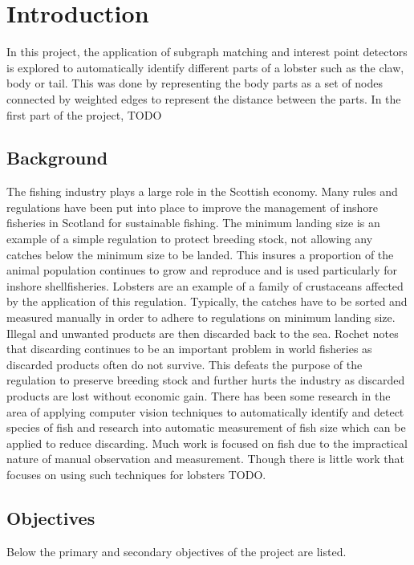 \section{Introduction}
In this project, the application of subgraph matching and interest point detectors is explored to automatically identify different parts of a lobster such as the claw, body or tail. This was done by representing the body parts as a set of nodes connected by weighted edges to represent the distance between the parts. 
\n
In the first part of the project, TODO


\subsection{Background}
The fishing industry plays a large role in the Scottish economy. Many rules and regulations have been put into place to improve the management of inshore fisheries in Scotland for sustainable fishing. The minimum landing size is an example of a simple regulation to protect breeding stock, not allowing any catches below the minimum size to be landed. This insures a proportion of the animal population continues to grow and reproduce \cite{masts-report} and is used particularly for inshore shellfisheries. Lobsters are an example of a family of crustaceans affected by the application of this regulation. 
\n
Typically, the catches have to be sorted and measured manually in order to adhere to regulations on minimum landing size. Illegal and unwanted products are then discarded back to the sea. Rochet \cite{discard} notes that discarding continues to be an important problem in world fisheries as discarded products often do not survive. This defeats the purpose of the regulation to preserve breeding stock and further hurts the industry as discarded products are lost without economic gain. 
\n
There has been some research in the area of applying computer vision techniques to automatically identify and detect species of fish \cite{iobserver} \cite{fish-detection} and research into automatic measurement of fish size \cite{fish-size} \cite{fish-size2} which can be applied to reduce discarding. Much work is focused on fish due to the impractical nature of manual observation and measurement. Though there is little work that focuses on using such techniques for lobsters TODO.

\subsection{Objectives}
Below the primary and secondary objectives of the project are listed. 
